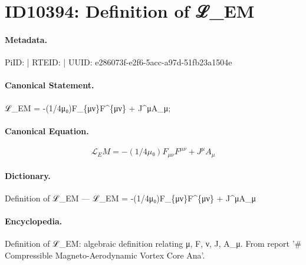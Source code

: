\section*{ID10394: Definition of ℒ\_EM}
\paragraph{Metadata.}
PiID:  | RTEID:  | UUID: e286073f-e2f6-5acc-a97d-51fb23a1504e

\paragraph{Canonical Statement.}
ℒ\_EM = -(1/4μ₀)F\_\{μν\}F\textasciicircum{}\{μν\} + J\textasciicircum{}μA\_μ;

\paragraph{Canonical Equation.}
\[
ℒ_EM = -(1/4μ₀)F_{μν}F^{μν} + J^μA_μ
\]

\paragraph{Dictionary.}
Definition of ℒ\_EM — ℒ\_EM = -(1/4μ₀)F\_\{μν\}F\textasciicircum{}\{μν\} + J\textasciicircum{}μA\_μ

\paragraph{Encyclopedia.}
Definition of ℒ\_EM: algebraic definition relating μ, F, ν, J, A\_μ. From report '\# Compressible Magneto-Aerodynamic Vortex Core Ana'.
